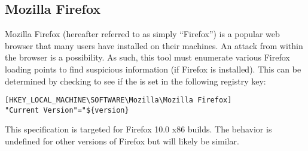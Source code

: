 \subsection{Mozilla Firefox}
Mozilla Firefox (hereafter referred to as simply ``Firefox'') is a popular web
browser that many users have installed on their machines.  An attack from within
the browser is a possibility.  As such, this tool must enumerate various Firefox
loading points to find suspicious information (if Firefox is installed).  This
can be determined by checking to see if the  is set in the
following registry key:
\begin{verbatim}
[HKEY_LOCAL_MACHINE\SOFTWARE\Mozilla\Mozilla Firefox] 
"Current Version"="${version}
\end{verbatim}

This specification is targeted for Firefox 10.0 x86 builds.  The behavior is
undefined for other versions of Firefox but will likely be similar.

